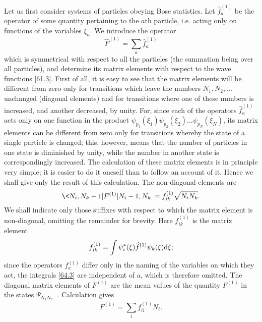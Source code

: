 Let us first consider systems of particles obeying Bose statistics. Let $ \hat{f}_a^{(1)} $ be the operator of some quantity pertaining to the $ a $th particle, i.e. acting only on functions of the variables $\xi_a$. We introduce the operator
\begin{equation}\label{64.1}
\hat{F}^{(1)}=\sum_a\hat{f}_a^{(1)}
\end{equation}
which is symmetrical with respect to all the particles (the summation being over all particles), and determine its matrix elements with respect to the wave functions \eqref{61.3}. First of all, it is easy to see that the matrix elements will be different from zero only for transitions which leave the numbers $ N_1, N_2, \dots $ unchanged (diagonal elements) and for transitions where one of these numbers is increased, and another decreased, by unity. For, since each of the operators $ \hat{f}_a^{(1)} $ acts only on one function in the product $ \psi_{p_1}(\xi_1)\psi_{p_2}(\xi_2)\dots \psi_{p_N}(\xi_N) $, its matrix elements can be different from zero only for transitions whereby the state of a single particle is changed; this, however, means that the number of particles in one state is diminished by unity, while the number in another state is correspondingly increased. The calculation of these matrix elements is in principle very simple; it is easier to do it oneself than to follow an account of it. Hence we shall give only the result of this calculation. The non-diagonal elements are
\begin{equation}\label{64.2}
\< N_i,N_k-1|F^{(1)}|N_i-1,N_k\>=f_{ik}^{(1)}\sqrt{N_iN_k}.
\end{equation}
We shall indicate only those suffixes with respect to which the matrix element is non-diagonal, omitting the remainder for brevity. Here $ f_{ik}^{(1)} $ is the matrix element
\begin{equation}\label{64.3}
f_{ik}^{(1)}=\int\psi_i^*(\xi)\widehat{f}^{(1)}\psi_k(\xi)\mathrm{d}\xi;
\end{equation}
since the operators $ f_a^{(1)} $ differ only in the naming of the variables on which they act, the integrals \eqref{64.3} are independent of a, which is therefore omitted. The diagonal matrix elements of $ F^{(1)} $ are the mean values of the quantity $ F^{(1)} $ in the states $ \Psi_{N_1N_2\dots} $. Calculation gives
\begin{equation}\label{64.4}
\bar{F^{(1)}}=\sum_i f_{ii}^{(1)}N_i.
\end{equation}



